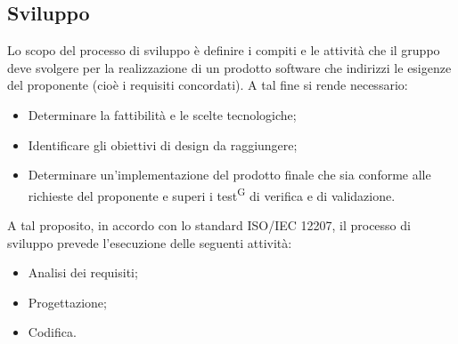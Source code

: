 \subsection{Sviluppo}\label{sec:processi_primari:sviluppo}
Lo scopo del processo di sviluppo è definire i compiti e le attività che il gruppo deve svolgere per la realizzazione di un prodotto software che indirizzi le esigenze del proponente (cioè i requisiti concordati). A tal fine si rende necessario:
\begin{itemize}
    \item Determinare la fattibilità e le scelte tecnologiche;
    \item Identificare gli obiettivi di design da raggiungere;
    \item Determinare un'implementazione del prodotto finale che sia conforme alle richieste del proponente e superi i test\textsuperscript{G} di verifica e di validazione.
\end{itemize}
A tal proposito, in accordo con lo standard ISO/IEC 12207, il processo di sviluppo prevede l’esecuzione delle seguenti attività:
\begin{itemize}
    \item Analisi dei requisiti;
    \item Progettazione;
    \item Codifica.
\end{itemize}

